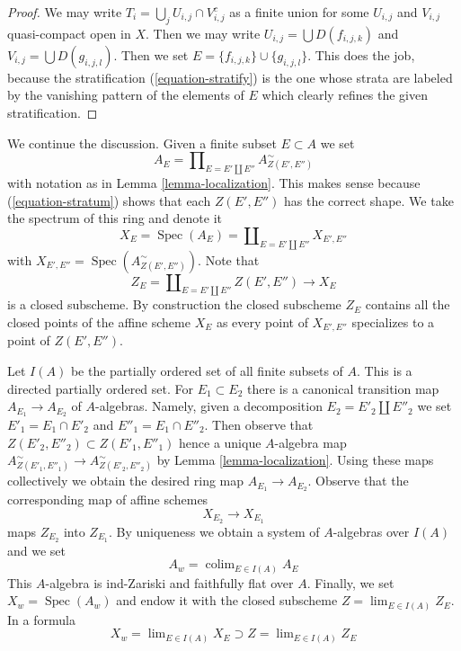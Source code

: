 \documentclass{stacks-project}
\theoremstyle{plain}
\theoremstyle{definition}
\theoremstyle{remark}
\numberwithin{equation}{subsection}
\def\lim{\mathop{\mathrm{lim}}\nolimits}
\def\colim{\mathop{\mathrm{colim}}\nolimits}
\def\Spec{\mathop{\mathrm{Spec}}}
\begin{document}
\begin{proof}
We may write $T_i = \bigcup_j U_{i, j} \cap V_{i, j}^c$ as a finite union
for some $U_{i, j}$ and $V_{i, j}$ quasi-compact open in $X$.
Then we may write $U_{i, j} = \bigcup D(f_{i, j, k})$ and
$V_{i, j} = \bigcup D(g_{i, j, l})$. Then we set
$E = \{f_{i, j, k}\} \cup \{g_{i, j, l}\}$. This does the job, because
the stratification (\ref{equation-stratify}) is the one whose strata are
labeled by the vanishing pattern of the elements of $E$ which
clearly refines the given stratification.
\end{proof}

\noindent
We continue the discussion.
Given a finite subset $E \subset A$ we set
\begin{equation}
\label{equation-ring}
A_E = \prod\nolimits_{E = E' \amalg E''} A_{Z(E', E'')}^\sim
\end{equation}
with notation as in Lemma \ref{lemma-localization}. This makes sense because
(\ref{equation-stratum}) shows that each $Z(E', E'')$ has the correct shape.
We take the spectrum of this ring and denote it
\begin{equation}
\label{equation-spectrum}
X_E = \Spec(A_E) = \coprod\nolimits_{E = E' \amalg E''} X_{E', E''}
\end{equation}
with $X_{E', E''} = \Spec(A_{Z(E', E'')}^\sim)$. Note that
\begin{equation}
\label{equation-closed}
Z_E = \coprod\nolimits_{E = E' \amalg E''} Z(E', E'')
\longrightarrow
X_E
\end{equation}
is a closed subscheme. By construction the closed subscheme $Z_E$
contains all the closed points of the affine scheme $X_E$ as every point
of $X_{E', E''}$ specializes to a point of $Z(E', E'')$.

\medskip\noindent
Let $I(A)$ be the partially ordered set of all finite subsets of $A$.
This is a directed partially ordered set. For $E_1 \subset E_2$ there
is a canonical transition map $A_{E_1} \to A_{E_2}$ of $A$-algebras.
Namely, given a decomposition $E_2 = E'_2 \amalg E''_2$ we set
$E'_1 = E_1 \cap E'_2$ and $E''_1 = E_1 \cap E''_2$. Then observe that
$Z(E'_2, E''_2) \subset Z(E'_1, E''_1)$ hence a unique $A$-algebra map
$A_{Z(E'_1, E''_1)}^\sim \to A_{Z(E'_2, E''_2)}^\sim$ by
Lemma \ref{lemma-localization}. Using these maps collectively we obtain
the desired ring map $A_{E_1} \to A_{E_2}$. Observe that the corresponding
map of affine schemes
\begin{equation}
\label{equation-transition}
X_{E_2} \longrightarrow X_{E_1}
\end{equation}
maps $Z_{E_2}$ into $Z_{E_1}$. By uniqueness we obtain a system of
$A$-algebras over $I(A)$ and we set
\begin{equation}
\label{equation-colimit-ring}
A_w = \colim_{E \in I(A)} A_E
\end{equation}
This $A$-algebra is ind-Zariski and faithfully flat over $A$.
Finally, we set $X_w = \Spec(A_w)$ and endow it with the closed subscheme
$Z = \lim_{E \in I(A)} Z_E$. In a formula
\begin{equation}
\label{equation-final}
X_w = \lim_{E \in I(A)} X_E \supset Z = \lim_{E \in I(A)} Z_E
\end{equation}
\end{document}
